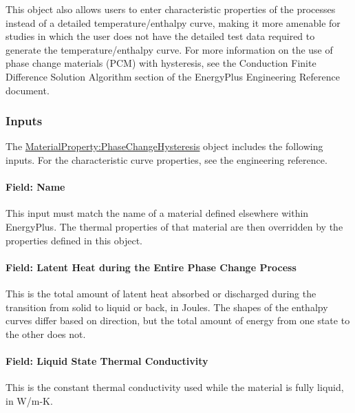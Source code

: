 This object also allows users to enter characteristic properties of the processes instead of a detailed temperature/enthalpy curve, making it more amenable for studies in which the user does not have the detailed test data required to generate the temperature/enthalpy curve. For more information on the use of phase change materials (PCM) with hysteresis, see the Conduction Finite Difference Solution Algorithm section of the EnergyPlus Engineering Reference document.

\subsubsection{Inputs}\label{materialpropertyphasechangehysteresis-inputs}

The \hyperref[materialpropertyphasechangehysteresis]{MaterialProperty:PhaseChangeHysteresis} object includes the following inputs. For the characteristic curve properties, see the engineering reference.

\paragraph{Field: Name}\label{materialpropertyphasechangehysteresis-name}

This input must match the name of a material defined elsewhere within EnergyPlus. The thermal properties of that material are then overridden by the properties defined in this object.

\paragraph{Field: Latent Heat during the Entire Phase Change Process}\label{materialpropertyphasechangehysteresis-inputs-latent-heat-during-the-entire-phase-change-process}

This is the total amount of latent heat absorbed or discharged during the transition from solid to liquid or back, in Joules. The shapes of the enthalpy curves differ based on direction, but the total amount of energy from one state to the other does not.

\paragraph{Field: Liquid State Thermal Conductivity}\label{materialpropertyphasechangehysteresis-inputs-liquidk}

This is the constant thermal conductivity used while the material is fully liquid, in W/m-K.

